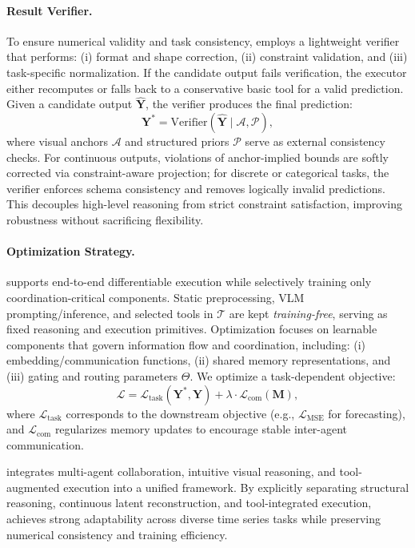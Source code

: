 \paragraph{Result Verifier.}
To ensure numerical validity and task consistency, \model employs a lightweight verifier that performs:
(i) format and shape correction,
(ii) constraint validation, and
(iii) task-specific normalization.
If the candidate output fails verification, the executor either recomputes or falls back to a conservative basic tool for a valid prediction.
Given a candidate output $\hat{\mathbf{Y}}$, the verifier produces the final prediction:
\begin{equation}
\mathbf{Y}^{*} = \text{Verifier}(\hat{\mathbf{Y}} \mid \mathcal{A}, \mathcal{P}),
\end{equation}
where visual anchors $\mathcal{A}$ and structured priors $\mathcal{P}$ serve as external consistency checks.
For continuous outputs, violations of anchor-implied bounds are softly corrected via constraint-aware projection; for discrete or categorical tasks, the verifier enforces schema consistency and removes logically invalid predictions.
This decouples high-level reasoning from strict constraint satisfaction, improving robustness without sacrificing flexibility.

\paragraph{Optimization Strategy.}
\model supports end-to-end differentiable execution while selectively training only coordination-critical components.
Static preprocessing, VLM prompting/inference, and selected tools in $\mathcal{T}$ are kept \emph{training-free}, serving as fixed reasoning and execution primitives.
Optimization focuses on learnable components that govern information flow and coordination, including:
(i) embedding/communication functions,
(ii) shared memory representations,
and (iii) gating and routing parameters $\Theta$.
We optimize a task-dependent objective:
\begin{equation}
\mathcal{L}
= \mathcal{L}_{\text{task}}(\mathbf{Y}^{*}, \mathbf{Y})
+ \lambda \cdot \mathcal{L}_{\text{com}}(\mathbf{M}),
\end{equation}
where $\mathcal{L}_{\text{task}}$ corresponds to the downstream objective (e.g., $\mathcal{L}_{\mathrm{MSE}}$ for forecasting),
and $\mathcal{L}_{\text{com}}$ regularizes memory updates to encourage stable inter-agent communication.

\model integrates multi-agent collaboration, intuitive visual reasoning, and tool-augmented execution into a unified framework.
By explicitly separating structural reasoning, continuous latent reconstruction, and tool-integrated execution, \model achieves strong adaptability across diverse time series tasks while preserving numerical consistency and training efficiency.
